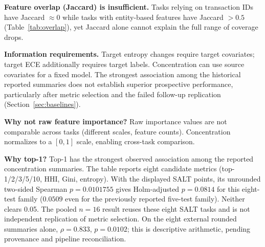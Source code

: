 \documentclass[accepted]{uai2026} %
\begin{document}
\textbf{Feature overlap (Jaccard) is insufficient.} Tasks relying on transaction IDs have Jaccard $\approx 0$ while tasks with entity-based features have Jaccard $> 0.5$ (Table~\ref{tab:overlap}), yet Jaccard alone cannot explain the full range of coverage drops.

\textbf{Information requirements.} Target entropy changes require target covariates; target ECE additionally requires target labels. Concentration can use source covariates for a fixed model. The strongest association among the historical reported summaries does not establish superior prospective performance, particularly after metric selection and the failed follow-up replication (Section~\ref{sec:baselines}).

\textbf{Why not raw feature importance?} Raw importance values are not comparable across tasks (different scales, feature counts). Concentration normalizes to a $[0,1]$ scale, enabling cross-task comparison.

\textbf{Why top-1?} Top-1 has the strongest observed association among the reported concentration summaries. The table reports eight candidate metrics (top-1/2/3/5/10, HHI, Gini, entropy). With the displayed SALT points, its unrounded two-sided Spearman $p=0.0101755$ gives Holm-adjusted $p=0.0814$ for this eight-test family ($0.0509$ even for the previously reported five-test family). Neither clears 0.05. The pooled $n=16$ result reuses these eight SALT tasks and is not independent replication of metric selection. On the eight external rounded summaries alone, $\rho=0.833$, $p=0.0102$; this is descriptive arithmetic, pending provenance and pipeline reconciliation.
\end{document}
